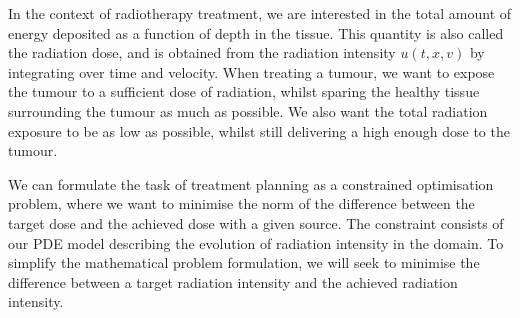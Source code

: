 


In the context of radiotherapy treatment, we are interested in the total amount of energy deposited as a function of depth in the tissue. This quantity is also called the radiation dose, and is obtained from the radiation intensity $u(t,x,v)$ by integrating over time and velocity. When treating a tumour, we want to expose the tumour to a sufficient dose of radiation, whilst sparing the healthy tissue surrounding the tumour as much as possible. We also want the total radiation exposure to be as low as possible, whilst still delivering a high enough dose to the tumour. 

We can formulate the task of treatment planning as a constrained optimisation problem, where we want to minimise the norm of the difference between the target dose and the achieved dose with a given source. The constraint consists of our PDE model describing the evolution of radiation intensity in the domain. To simplify the mathematical problem formulation, we will seek to minimise the difference between a target radiation intensity and the achieved radiation intensity.


